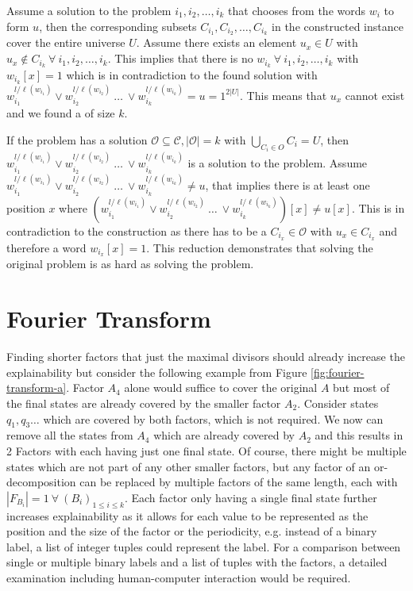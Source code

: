 Assume a solution to the {} problem $i_1, i_2, \dots, i_k$ that chooses from the words $w_i$ to form $u$, then the corresponding subsets $C_{i_1}, C_{i_2}, \dots, C_{i_k}$ in the constructed {} instance cover the entire universe $U$.
Assume there exists an element $u_x \in U$ with $u_x \not \in C_{i_k} ~\forall~ i_1, i_2, \dots, i_k$.
This implies that there is no $w_{i_k} ~\forall~ i_1, i_2, \dots, i_k$ with $w_{i_k}[x]=1$ which is in contradiction to the found solution with $w_{i_1}^{l / \ell(w_{i_1})} \lor w_{i_2}^{l / \ell(w_{i_2})} ~\dots~ \lor w_{i_k}^{l / \ell(w_{i_k})} = u = 1^{2|U|}$.
This means that $u_x$ cannot exist and we found a {} of size $k$.

If the {} problem has a solution $\mathcal{O} \subseteq \mathcal{C}, |\mathcal{O}|=k$ with $\bigcup_{C_i \in O} C_i = U$, then $w_{i_1}^{l / \ell(w_{i_1})} \lor w_{i_2}^{l / \ell(w_{i_2})} ~\dots~ \lor w_{i_k}^{l / \ell(w_{i_k})}$ is a solution to the {} problem.
Assume $w_{i_1}^{l / \ell(w_{i_1})} \lor w_{i_2}^{l / \ell(w_{i_2})} ~\dots~ \lor w_{i_k}^{l / \ell(w_{i_k})} \not = u$, that implies there is at least one position $x$ where $(w_{i_1}^{l / \ell(w_{i_1})} \lor w_{i_2}^{l / \ell(w_{i_2})} ~\dots~ \lor w_{i_k}^{l / \ell(w_{i_k})})[x] \not= u[x] $.
This is in contradiction to the construction as there has to be a $C_{i_x} \in \mathcal{O}$ with $u_x \in C_{i_x}$ and therefore a word $w_{i_x}[x]=1$. This reduction demonstrates that solving the original problem is as hard as solving the {} problem.


\section{Fourier Transform}
\label{ch:novel-algos:fourier}
Finding shorter factors that just the maximal divisors should already increase the explainability but consider the following example from Figure \ref{fig:fourier-transform-a}.
Factor $A_4$ alone would suffice to cover the original \DFA $A$ but most of the final states are already covered by the smaller factor $A_2$.
Consider states $q_1, q_3 \dots$ which are covered by both factors, which is not required.
We now can remove all the states from $A_4$ which are already covered by $A_2$ and this results in 2 Factors with each having just one final state.
Of course, there might be multiple states which are not part of any other smaller factors, but any factor of an or-decomposition can be replaced by multiple factors of the same length, each with $|F_{B_i}| = 1 ~\forall~ (B_i)_{1 \leq i \leq k}$.
Each factor only having a single final state further increases explainability as it allows for each value to be represented as the position and the size of the factor or the periodicity, e.g. instead of a binary label, a list of integer tuples could represent the label.
For a comparison between single or multiple binary labels and a list of tuples with the factors, a detailed examination including human-computer interaction would be required.

